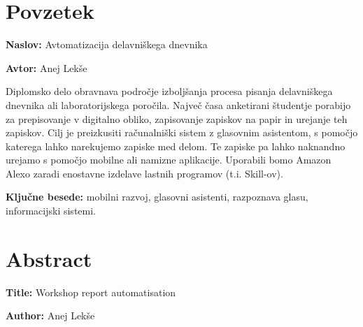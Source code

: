 \documentclass[a4paper, 12pt]{book}
\newcommand{\ttitle}{Avtomatizacija delavniškega dnevnika}
\newcommand{\ttitleEn}{Workshop report automatisation}
\newcommand{\tauthor}{Anej Lekše}
\newcommand{\tkeywords}{mobilni razvoj, glasovni asistenti, razpoznava glasu, informacijski sistemi}
\newcommand{\clearemptydoublepage}{\newpage{\pagestyle{empty}\cleardoublepage}}
\begin{document}
\clearemptydoublepage

\chapter*{Povzetek}

\noindent\textbf{Naslov:} \ttitle
\bigskip

\noindent\textbf{Avtor:} \tauthor
\bigskip


\noindent Diplomsko delo obravnava področje izboljšanja procesa pisanja delavniškega dnevnika ali laboratorijskega poročila.
Največ časa anketirani študentje porabijo za prepisovanje v digitalno obliko, zapisovanje zapiskov na papir in urejanje teh zapiskov. 
Cilj je preizkusiti računalniški sistem z glasovnim asistentom, s pomočjo katerega lahko narekujemo zapiske med delom. 
Te zapiske pa lahko naknandno urejamo s pomočjo mobilne ali namizne aplikacije.
Uporabili bomo Amazon Alexo zaradi enostavne izdelave lastnih programov (t.i. Skill-ov).

\bigskip

\noindent\textbf{Ključne besede:} \tkeywords.
\clearemptydoublepage

\chapter*{Abstract}

\noindent\textbf{Title:} \ttitleEn
\bigskip

\noindent\textbf{Author:} \tauthor
\bigskip
\end{document}
